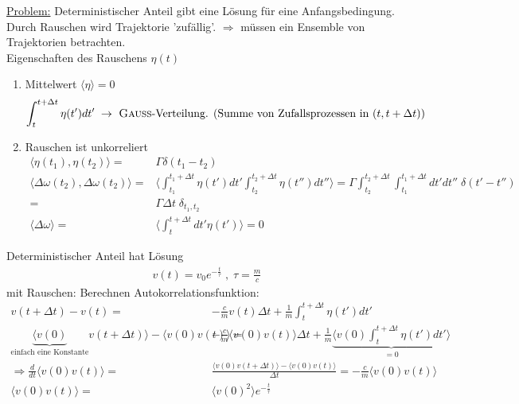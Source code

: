 \documentclass[12pt]{article}
\begin{document}
\underline{Problem:} Deterministischer Anteil gibt eine Lösung für eine Anfangsbedingung. Durch Rauschen wird Trajektorie 'zufällig'. $\Rightarrow$ müssen ein Ensemble von Trajektorien betrachten.\\
Eigenschaften des Rauschens $\eta (t)$ 
\begin{enumerate}
\item Mittelwert $\langle \eta \rangle = 0 $
\begin{align}
\int_t^{t + \Delta t} \eta (t') dt' \; \to \mbox{ \textsc{Gauss}-Verteilung. (Summe von Zufallsprozessen in } (t, t+\Delta t) )
\end{align}

\item Rauschen ist unkorreliert 
\begin{align}
 \langle \eta(t_1), \eta (t_2) \rangle =& \Gamma \delta (t_1 - t_2)\\
 \langle\Delta \omega(t_2), \Delta \omega(t_2)\rangle
 =& \langle \int_{t_1}^{t_1 + \Delta t} \eta (t') dt'  \int_{t_2}^{t_2 + \Delta t} \eta (t'') dt'' \rangle 
 = \Gamma  \int_{t_2}^{t_2 + \Delta t} \int_{t_1}^{t_1 + \Delta t} dt' dt'' \; \delta(t'-t'') \\
 =& \Gamma \Delta t\;  \delta_{t_1,t_2}  \\
 \langle \Delta \omega \rangle =& \langle \int_t^{t+\Delta t} dt' \eta (t') \rangle =0
\end{align}
\end{enumerate}
Deterministischer Anteil hat Lösung
\begin{align}
v(t) = v_0 e^{- \frac{t}{\tau}} \; , \; \tau = \frac{m}{c}
\end{align}
mit Rauschen: Berechnen Autokorrelationsfunktion:
\begin{align}
v(t+ \Delta t ) - v(t) =& - \frac{c}{m} v(t) \Delta t + \frac{1}{m} \int_t^{t+\Delta t} \eta (t') dt' \\
\underbrace{ \langle v(0)}_\text{einfach eine Konstante} v(t+ \Delta t ) \rangle - \langle v(0) v(t) \rangle =&- \frac{c}{m} \langle v(0) v(t) \rangle \Delta t + \frac{1}{m} \underbrace{ \langle v(0) \int_t^{t+\Delta t} \eta (t') dt' \rangle }_\text{$=0$} \\
\Rightarrow \frac{d}{dt} \langle v(0) v(t) \rangle 
=& \frac{\langle v(0) v(t+ \Delta t) \rangle - \langle v(0) v(t) \rangle}{\Delta t} = - \frac{c}{m} \langle v(0) v(t) \rangle \\
\langle v(0) v(t) \rangle =& \langle v(0)^2 \rangle e^{-\frac{t}{\tau}}
\end{align}
\end{document}
